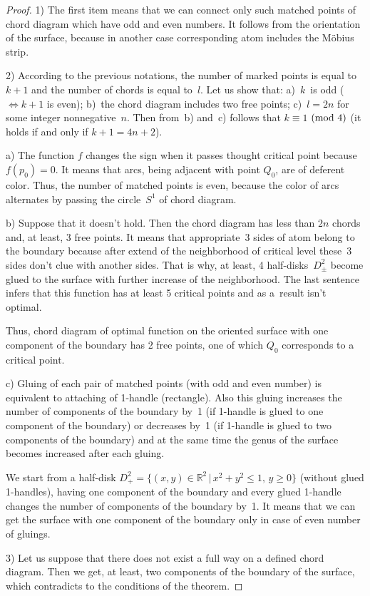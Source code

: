 \documentclass[10pt,a4paper]{amsart}
\numberwithin{equation}{section}
\begin{document}
\begin{proof}
1) The f\/irst item means that we can connect only such matched points of chord diagram which have odd and even numbers. It follows from the orientation of the surface, because in another case corresponding atom includes the M\"{o}bius strip.

2) According to the previous notations, the number of marked points is equal to $k+1$ and the number of chords is equal to~$l$. Let us show that: a)~$k$~is odd ($\Leftrightarrow k+1$ is even); b)~the chord diagram includes two free points; c)~$l=2n$ for some integer nonnegative~$n$. Then from~b) and~c) follows that $k\equiv1$ $({\rm mod}~4)$ (it holds if and only if $k+1=4n+2$).

a) The function $f$ changes the sign when it passes thought critical point because $f(p_{0})=0$. It means that arcs, being adjacent with point $Q_0$, are of deferent color. Thus, the number of matched points is even, because the color of arcs alternates by passing the circle~$S^1$ of chord diagram.

b) Suppose that it doesn't hold. Then the chord diagram has less than $2n$ chords and, at least, 3 free points. It means that appropriate~3 sides of atom belong to the boundary because after extend of the neighborhood of critical level these~3 sides don't clue with another sides. That is why, at least, 4 half-disks~$D^{2}_{\pm}$ become glued to the surface with further increase of the neighborhood. The last sentence infers that this function has at least 5 critical points and as a~result isn't optimal.

Thus, chord diagram of optimal function on the oriented surface with one component of the boundary has 2 free points, one of which $Q_{0}$ corresponds to a critical point.

c) Gluing of each pair of matched points (with odd and even number) is equivalent to attaching of 1-handle (rectangle). Also this gluing increases the number of components of the boundary by~1 (if 1-handle is glued to one component of the boundary) or decreases by~1 (if 1-handle is glued to two components of the boundary) and at the same time the genus of the surface becomes increased after each gluing.

We start from a half-disk $D^{2}_{+}=\{(x,y)\in\mathbb{R}^{2}\,|\, x^{2}+y^{2}\leq1,\, y\geq0\}$ (without glued 1-handles), having one component of the boundary and every glued 1-handle changes the number of components of the boundary by~1. It means that we can get the surface with one component of the boundary only in case of even number of gluings.

3) Let us suppose that there does not exist a full way on a def\/ined chord diagram. Then we get, at least, two components of the boundary of the surface, which contradicts to the conditions of the theorem.
\end{proof}
\end{document}
